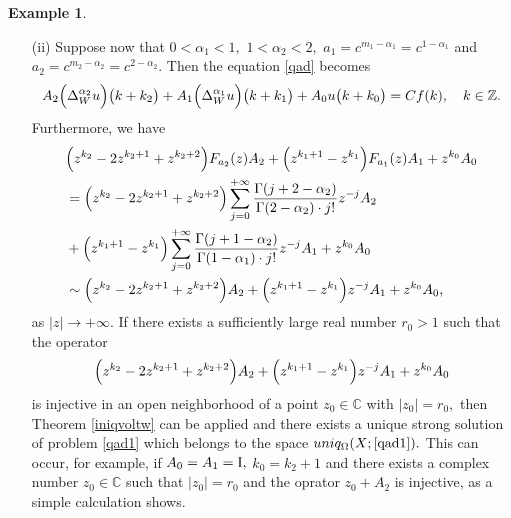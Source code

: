 \documentclass{amsart}
\theoremstyle{definition}
\newtheorem{example}[thm]{Example}
\theoremstyle{remark}
\numberwithin{equation}{section}
\begin{document}
\begin{example}
\begin{itemize}
{\begin{align*}
\end{align*}}After that, we compute
\begin{align*} &
\sum_{s=0}^{+\infty}\Bigl| a_{w}(s)\Bigr| \sum_{l=-\infty}^{k-s}  r^{k-l-s}e^{-l^{2}}
 \leq M\sum_{s=0}^{+\infty}\sum_{v=0}^{+\infty}e^{\omega s}r^{v}e^{-(v+s-k)^{2}}
\\& \leq M\sum_{s=0}^{+\infty}\sum_{v=0}^{+\infty}e^{\omega s}r^{v}e^{-v^{2}}e^{-s^{2}}e^{2vk}e^{2sk}
\leq M \sum_{s=0}^{+\infty}e^{\omega s}e^{-s^{2}}e^{2sk} \cdot \sum_{v=0}^{+\infty}r^{v}e^{-v^{2}}e^{2vk}
<+\infty .
\end{align*}
Therefore, conditions (i)-(iii) in formulation of Theorem \ref{movesvoltw} hold. We can apply the Cauchy theorem in order to see that condition (iv) in formulation of Theorem \ref{movesvoltw} also holds; cf. Example \ref{zan} for more details.
\item[(ii)] Suppose now that $0<\alpha_{1}<1,$ $1<\alpha_{2}<2,$ $a_{1}=c^{m_{1}-\alpha_{1}}=c^{1-\alpha_{1}}$ and $a_{2}=c^{m_{2}-\alpha_{2}}=c^{2-\alpha_{2}}.$ Then the equation \eqref{qad} becomes 
\begin{align}\label{qad1}
A_{2}\Bigl( \Delta_{W}^{\alpha_{2}}u\Bigr)\bigl(k+k_{2}\bigr)+A_{1}\Bigl( \Delta_{W}^{\alpha_{1}}u\Bigr)\bigl(k+k_{1}\bigr)+A_{0} u \bigl(k+k_{0}\bigr)=Cf(k),\quad k\in {\mathbb Z}.
\end{align}
Furthermore, we have
\begin{align*} &
\Bigl( z^{k_{2}}-2z^{k_{2}+1}+z^{k_{2}+2}\Bigr)F_{a_{2}}(z)A_{2}+\Bigl( z^{k_{1}+1}-z^{k_{1}}\Bigr)F_{a_{1}}(z)A_{1}+z^{k_{0}}A_{0}
\\& =\Bigl( z^{k_{2}}-2z^{k_{2}+1}+z^{k_{2}+2}\Bigr)\sum_{j=0}^{+\infty} \frac{\Gamma(j+2-\alpha_{2})}{\Gamma (2-\alpha_{2}) \cdot j!}z^{-j} A_{2}
\\& +\Bigl( z^{k_{1}+1}-z^{k_{1}}\Bigr)\sum_{j=0}^{+\infty} \frac{\Gamma(j+1-\alpha_{2})}{\Gamma (1-\alpha_{1}) \cdot j!}z^{-j} A_{1}+z^{k_{0}}A_{0}
\\& \sim \Bigl( z^{k_{2}}-2z^{k_{2}+1}+z^{k_{2}+2}\Bigr)A_{2}
+\Bigl( z^{k_{1}+1}-z^{k_{1}}\Bigr)z^{-j} A_{1}+z^{k_{0}}A_{0},
\end{align*}
as $|z|\rightarrow +\infty .$ If there exists a sufficiently large real number $r_{0}>1$ such that the operator
$$
\Bigl( z^{k_{2}}-2z^{k_{2}+1}+z^{k_{2}+2}\Bigr)A_{2}
+\Bigl( z^{k_{1}+1}-z^{k_{1}}\Bigr)z^{-j} A_{1}+z^{k_{0}}A_{0}
$$
is injective in an open neighborhood of a point $z_{0}\in {\mathbb C}$ with $|z_{0}|=r_{0},$ then
Theorem \ref{iniqvoltw} can be applied and there exists a unique strong solution of problem
\eqref{qad1} which belongs to the space $uniq_{\Omega}(X;\eqref{qad1}).$  This can occur, for example, if $A_{0}=A_{1}={\rm I},$ $k_{0}=k_{2}+1$ and there exists a complex number $z_{0}\in {\mathbb C}$ such that $|z_{0}|=r_{0} $ and the oprator $z_{0}+A_{2}$ is injective, as a simple calculation shows.
\end{itemize}
\end{example}
\end{document}
